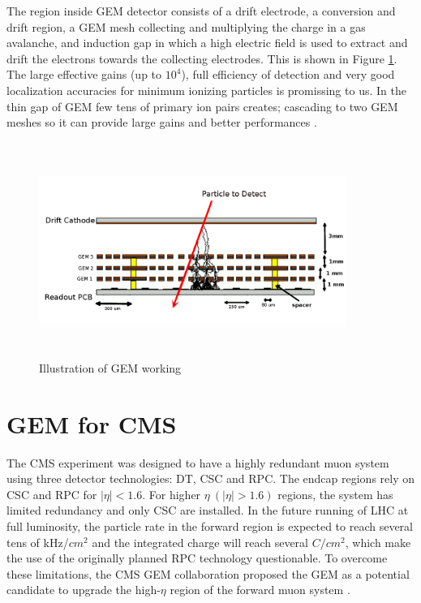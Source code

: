 The region inside GEM detector consists of a drift electrode, a conversion and drift region, a GEM mesh collecting and multiplying the charge in a gas avalanche, and induction gap in which a high electric field is used to extract and drift the electrons towards the collecting electrodes. This is shown in Figure \ref{gemgaps}. The large effective gains (up to $10^4$), full efficiency of detection and very good localization accuracies for minimum ionizing particles is promissing to us. In the thin gap of GEM few tens of primary ion pairs creates; cascading to two GEM meshes so it can provide large gains and better performances \cite{Bressan1999}.
\begin{figure}[htb]
	\begin{center}
		\includegraphics[width=10.0cm,height=7cm]{figures/GEM/triple_gem.png}
		\caption{Illustration of GEM working}
		\label{gemgaps}
	\end{center}
\end{figure} 

\section{GEM for CMS}
The CMS experiment was designed to have a highly redundant muon system using three detector technologies: DT, CSC and RPC. The endcap regions rely on CSC and RPC for $|\eta|<1.6$. For higher $\eta~ (|\eta|>1.6)$ regions, the system has limited redundancy and only CSC are installed. In the future running of LHC at full luminosity, the particle rate in the forward region is expected to reach several tens of kHz/$cm^2$ and the integrated charge will reach several $C/cm^2$, which make the use of the originally planned RPC technology questionable. To overcome these limitations, the CMS GEM collaboration proposed the GEM as a potential candidate to upgrade the high-$\eta$ region of the forward muon system \cite{Colaleo:2021453}. 

